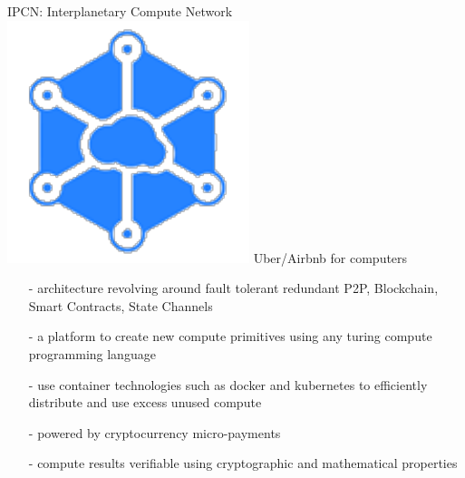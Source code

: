\documentclass[10pt]{beamer}
\begin{document}
\begin{frame}[t]{IPCN: Interplanetary Compute Network}
	\includegraphics[scale=.3]{static/ipcn-p2p} Uber/Airbnb for computers
    \begin{itemize}
        \item[-]architecture revolving around fault tolerant redundant P2P, Blockchain, Smart Contracts, State Channels
        \item[-]a platform to create new compute primitives using any turing compute programming language
        \item[-]use container technologies such as docker and kubernetes to efficiently distribute and use excess unused compute
        \item[-]powered by cryptocurrency micro-payments
        \item[-]compute results verifiable using cryptographic and mathematical properties
    \end{itemize}
\end{frame}
\end{document}
